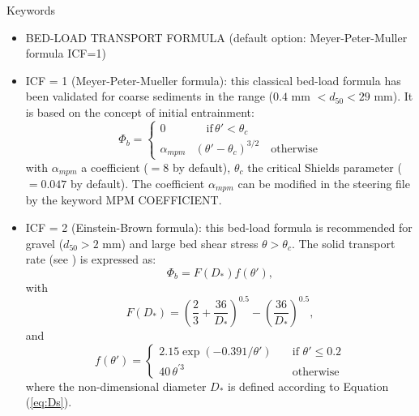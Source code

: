 \medskip
\begin{bclogo}[couleur=blue!10,arrondi=0.1, logo=\bcinfo]{Keywords}
\begin{itemize}
\item {\ttfamily BED-LOAD TRANSPORT FORMULA} (default option: Meyer-Peter-Muller formula {\ttfamily ICF=1})
\end{itemize}
\end{bclogo}

\begin{itemize}
\item {\ttfamily ICF = 1} (Meyer-Peter-Mueller formula):
this classical bed-load formula has been validated for coarse sediments in
the range ($0.4$ mm $< d_{50} < 29$ mm). It is based on the
concept of initial entrainment:
\begin{equation*}
\Phi_b=\left\{\begin{array}{ll}
0 & \quad\text{if}\,\theta'<\theta_c\\
\alpha_{mpm} & (\theta'-\theta_c)^{3/2}\quad\text{otherwise}
\end{array}
\right.
\end{equation*}
with $\alpha_{mpm}$ a coefficient ($=8$ by default), $\theta_c$ the critical Shields parameter ($= 0.047$ by default). The  coefficient $\alpha_{mpm}$ can be modified in the steering file by the keyword {\ttfamily MPM COEFFICIENT}.

\item {\ttfamily ICF = 2} (Einstein-Brown formula): this bed-load formula is recommended for gravel ($d_{50} > 2$ mm) and
large bed shear stress $\theta > \theta_c$. The solid
transport rate (see \cite{Einstein}) is expressed as:
\begin{equation}\label{eq:EinsteinBrown}
\Phi_b = F(D_*)f(\theta'), 
\end{equation}
with
\begin{equation}\label{eq:EinsteinFDs}
F(D_*) = \left(\frac{2}{3} +\frac{36}{D_*}\right)^{0.5} - \left( \frac{36}{D_*}\right)^{0.5}, 
\end{equation}
and
\begin{equation*}
f(\theta')=\left\{\begin{array}{ll}
2.15\exp(-0.391/\theta') & \quad\text{if}\,\,\theta' \leq 0.2 \\
40\,\theta^{'3}          & \quad\text{otherwise}
\end{array}
\right.
\end{equation*}
where the non-dimensional diameter $D_*$ is defined according to Equation (\ref{eq:Ds}).


\end{itemize}
